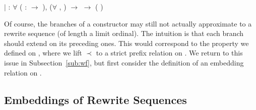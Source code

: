 \begin{singlespace}
\begin{coqdoccode}
\coqdocindent{1.00em}\label{coq:lim}
\ensuremath{|}  :
\ensuremath{\forall}  
( :
\ensuremath{\rightarrow} ),\coqdoceol
\coqdocindent{5.0em}
(\ensuremath{\forall} , 
 ) $\rightarrow$
 
 $\rightarrow$
(
)\coqdoceol
\end{coqdoccode}
\end{singlespace}

Of course, the branches of a 
constructor may still not actually approximate to a rewrite sequence (of
length a limit ordinal). The intuition is that each branch should extend on
its preceding ones. This would correspond to the
 property we defined on
, where we lift $\prec$ to a
strict prefix relation on
.
We return to this issue in Subsection~\ref{sub:wf}, but
first consider the definition of an embedding relation on
.


\subsection{Embeddings of Rewrite Sequences}\label{sub:embedding}

